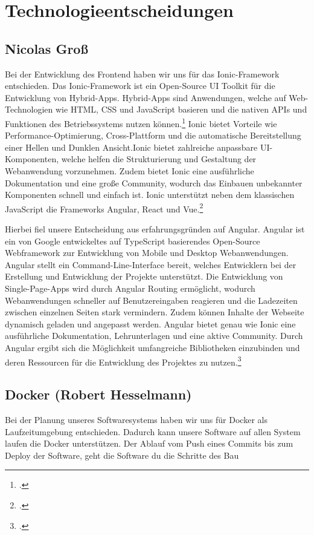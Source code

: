 
\section{Technologieentscheidungen}

\subsection*{Nicolas Groß}

Bei der Entwicklung des Frontend haben wir uns für das Ionic-Framework entschieden. Das Ionic-Framework ist ein Open-Source UI Toolkit für die Entwicklung von Hybrid-Apps. Hybrid-Apps sind Anwendungen, welche auf Web-Technologien wie HTML, CSS und JavaScript basieren und die nativen APIs und Funktionen des Betriebssystems nutzen können.\footcite[.vgl]{HybrideWebApp}  Ionic bietet Vorteile wie Performance-Optimierung, Cross-Plattform und die automatische Bereitstellung einer Hellen und Dunklen Ansicht.Ionic bietet zahlreiche anpassbare UI-Komponenten, welche helfen die Strukturierung und Gestaltung der Webanwendung vorzunehmen. Zudem bietet Ionic eine ausführliche Dokumentation und eine große Community, wodurch das Einbauen unbekannter Komponenten schnell und einfach ist. Ionic unterstützt neben dem klassischen JavaScript die Frameworks Angular, React und Vue.\footcite[.vgl]{Ionic2013}

Hierbei fiel unsere Entscheidung aus erfahrungsgründen auf Angular. Angular ist ein von Google entwickeltes auf TypeScript basierendes Open-Source Webframework zur Entwicklung von Mobile und Desktop Webanwendungen. Angular stellt ein Command-Line-Interface bereit, welches Entwicklern bei der Erstellung und Entwicklung der Projekte unterstützt. Die Entwicklung von Single-Page-Apps wird durch Angular Routing ermöglicht, wodurch Webanwendungen schneller auf Benutzereingaben reagieren und die Ladezeiten zwischen einzelnen Seiten stark vermindern. Zudem können Inhalte der Webseite dynamisch geladen und angepasst werden. Angular bietet genau wie Ionic eine ausführliche Dokumentation, Lehrunterlagen und eine aktive Community. Durch Angular ergibt sich die Möglichkeit umfangreiche Bibliotheken einzubinden und deren Ressourcen für die Entwicklung des Projektes zu nutzen.\footcite[.vgl]{Angular2016}


\subsection{Docker (Robert Hesselmann)}

Bei der Planung unseres Softwaresystems haben wir uns für Docker als Laufzeitumgebung entschieden. Dadurch kann unsere Software auf allen System laufen die Docker unterstützen. Der Ablauf vom Push eines Commits bis zum Deploy der Software, geht die Software du die Schritte des Bau